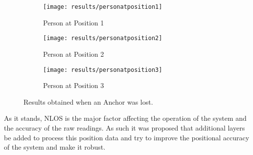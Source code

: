 \begin{figure}[h!]
    \centering
    \begin{subfigure}{0.45\textwidth}
            \texttt{[image: results/personatposition1]}
            \caption{Person at Position 1}
    \end{subfigure}
    \begin{subfigure}{0.45\textwidth}
            \texttt{[image: results/personatposition2]}
            \caption{Person at Position 2}
    \end{subfigure}
    \begin{subfigure}{0.45\textwidth}
            \texttt{[image: results/personatposition3]}
            \caption{Person at Position 3}
    \end{subfigure}
    \caption{Results obtained when an Anchor was lost.}
    \label{fig:persons}
\end{figure}
As it stands, NLOS is the major factor affecting the operation of the system and the accuracy of the raw readings.
As such it was proposed that additional layers be added to process this position data and try to improve the positional accuracy of the system and make it robust.

